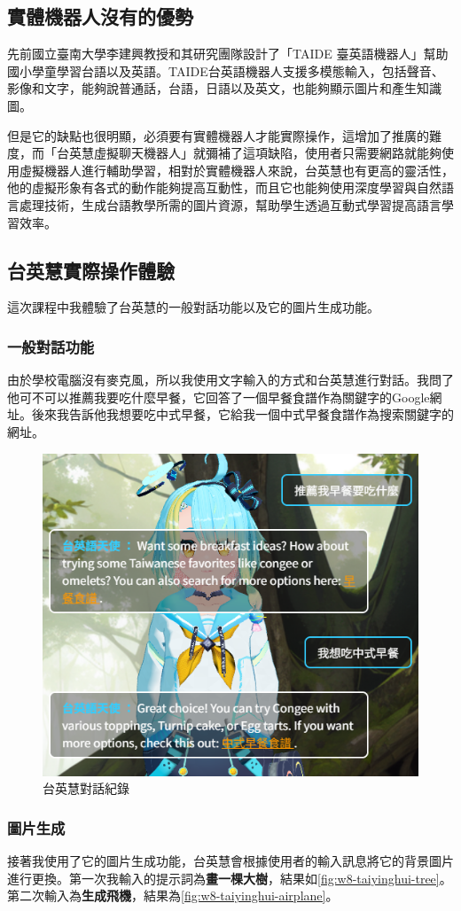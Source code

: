 \subsection{實體機器人沒有的優勢}
先前國立臺南大學李建興教授和其研究團隊設計了「TAIDE 臺英語機器人」幫助國小學童學習台語以及英語。TAIDE台英語機器人支援多模態輸入，包括聲音、影像和文字，能夠說普通話，台語，日語以及英文，也能夠顯示圖片和產生知識圖。\par
但是它的缺點也很明顯，必須要有實體機器人才能實際操作，這增加了推廣的難度，而「台英慧虛擬聊天機器人」就彌補了這項缺陷，使用者只需要網路就能夠使用虛擬機器人進行輔助學習，相對於實體機器人來說，台英慧也有更高的靈活性，他的虛擬形象有各式的動作能夠提高互動性，而且它也能夠使用深度學習與自然語言處理技術，生成台語教學所需的圖片資源，幫助學生透過互動式學習提高語言學習效率。


\subsection{台英慧實際操作體驗}
這次課程中我體驗了台英慧的一般對話功能以及它的圖片生成功能。

\subsubsection{一般對話功能}
由於學校電腦沒有麥克風，所以我使用文字輸入的方式和台英慧進行對話。我問了他可不可以推薦我要吃什麼早餐，它回答了一個早餐食譜作為關鍵字的Google網址。後來我告訴他我想要吃中式早餐，它給我一個中式早餐食譜作為搜索關鍵字的網址。
\begin{figure}[htbp!]
    \centering
    \includegraphics[width=0.5\linewidth]{images/w8/AIhist.png}
    \caption{台英慧對話紀錄}
    \label{fig:w8-chat-history}
\end{figure}


\subsubsection{圖片生成}
接著我使用了它的圖片生成功能，台英慧會根據使用者的輸入訊息將它的背景圖片進行更換。第一次我輸入的提示詞為\textbf{畫一棵大樹}，結果如\autoref{fig:w8-taiyinghui-tree}。第二次輸入為\textbf{生成飛機}，結果為\autoref{fig:w8-taiyinghui-airplane}。

